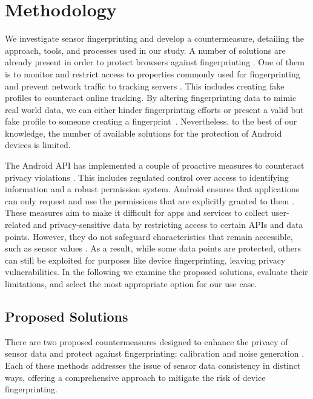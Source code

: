 \documentclass[11pt,
  oneside,openany,    %
]{scrreprt}
\begin{document}
\chapter{Methodology}
\label{chap:methodology}
We investigate sensor fingerprinting and develop a countermeasure, detailing the approach, tools, and processes used in our study.
A number of solutions are already present in order to protect browsers against fingerprinting \cite{DBLP:conf/secrypt/PolcakSMHM23, DBLP:conf/dbsec/FaizKhademiZW15, DBLP:conf/www/NikiforakisJL15, DBLP:conf/esorics/TorresJM15}. 
One of them is to monitor and restrict access to properties commonly used for fingerprinting and prevent network traffic to tracking servers \cite{DBLP:conf/secrypt/PolcakSMHM23}. 
This includes creating fake profiles to counteract online tracking. 
By altering fingerprinting data to mimic real world data, we can either hinder fingerprinting efforts or present a valid but fake profile to someone creating a fingerprint~\cite{DBLP:conf/nbis/FioreCSP14}.
Nevertheless, to the best of our knowledge, the number of available solutions for the protection of Android devices is limited.

The Android API has implemented a couple of proactive measures to counteract privacy violations \cite{android_privacy_10}.
This includes regulated control over access to identifying information and a robust permission system. 
Android ensures that applications can only request and use the permissions that are explicitly granted to them \cite{android_privacy_11}.
These measures aim to make it difficult for apps and services to collect user-related and privacy-sensitive data by restricting access to certain APIs and data points.
However, they do not safeguard characteristics that remain accessible, such as sensor values \cite{DBLP:journals/access/WuWWLY16}.
As a result, while some data points are protected, others can still be exploited for purposes like device fingerprinting, leaving privacy vulnerabilities.
In the following we examine the proposed solutions, evaluate their limitations, and select the most appropriate option for our use case.

\section{Proposed Solutions}
\label{sec:proposed}
There are two proposed countermeasures designed to enhance the privacy of sensor data and protect against fingerprinting: calibration and noise generation \cite{DBLP:conf/ndss/DasBC16}. 
Each of these methods addresses the issue of sensor data consistency in distinct ways, offering a comprehensive approach to mitigate the risk of device fingerprinting.
\end{document}
